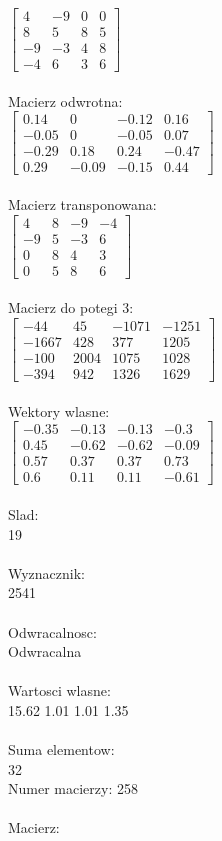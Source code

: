 \documentclass[a4paper,12pt]{article}
\begin{document}
$\begin{bmatrix} 4&-9&0&0\\8&5&8&5\\-9&-3&4&8\\-4&6&3&6 \end{bmatrix}$
\\
\\
Macierz odwrotna:\\

$\begin{bmatrix} 0.14&0&-0.12&0.16\\-0.05&0&-0.05&0.07\\-0.29&0.18&0.24&-0.47\\0.29&-0.09&-0.15&0.44 \end{bmatrix}$
\\
\\
Macierz transponowana:\\

$\begin{bmatrix} 4&8&-9&-4\\-9&5&-3&6\\0&8&4&3\\0&5&8&6 \end{bmatrix}$
\\
\\
Macierz do potegi 3:\\

$\begin{bmatrix} -44&45&-1071&-1251\\-1667&428&377&1205\\-100&2004&1075&1028\\-394&942&1326&1629 \end{bmatrix}$
\\
\\
Wektory wlasne:\\

$\begin{bmatrix} -0.35&-0.13&-0.13&-0.3\\0.45&-0.62&-0.62&-0.09\\0.57&0.37&0.37&0.73\\0.6&0.11&0.11&-0.61 \end{bmatrix}$
\\
\\
Slad:\\
19
\\
\\
Wyznacznik:\\
2541
\\
\\
Odwracalnosc:\\
Odwracalna
\\
\\
Wartosci wlasne:\\
15.62 1.01 1.01 1.35
\\
\\
Suma elementow:\\
32
\\
\newpage
Numer macierzy:
258
\\
\\
Macierz:\\
\end{document}
